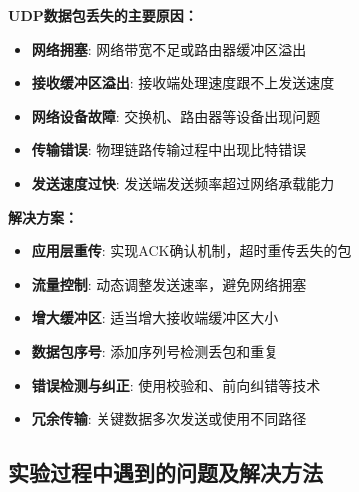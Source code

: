 \documentclass[a4paper]{article}
\begin{document}
\noindent
\begin{minipage}[t]{0.48\textwidth}
\begin{myquote}
\textbf{UDP数据包丢失的主要原因：}
\begin{itemize}
    \item \textbf{网络拥塞}: 网络带宽不足或路由器缓冲区溢出
    \item \textbf{接收缓冲区溢出}: 接收端处理速度跟不上发送速度
    \item \textbf{网络设备故障}: 交换机、路由器等设备出现问题
    \item \textbf{传输错误}: 物理链路传输过程中出现比特错误
    \item \textbf{发送速度过快}: 发送端发送频率超过网络承载能力
\end{itemize}
\end{myquote}
\end{minipage}
\hfill
\begin{minipage}[t]{0.48\textwidth}
\begin{myquote}
\textbf{解决方案：}
\begin{itemize}
    \item \textbf{应用层重传}: 实现ACK确认机制，超时重传丢失的包
    \item \textbf{流量控制}: 动态调整发送速率，避免网络拥塞
    \item \textbf{增大缓冲区}: 适当增大接收端缓冲区大小
    \item \textbf{数据包序号}: 添加序列号检测丢包和重复
    \item \textbf{错误检测与纠正}: 使用校验和、前向纠错等技术
    \item \textbf{冗余传输}: 关键数据多次发送或使用不同路径
\end{itemize}
\end{myquote}
\end{minipage}

\subsection{实验过程中遇到的问题及解决方法}
\end{document}
